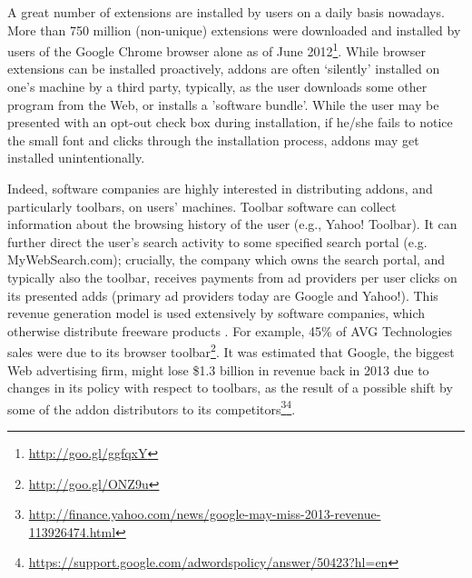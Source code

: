 \documentclass[ijoc,nonblindrev]{informs3} %
\numberwithin{equation}{subsection}
\begin{document}
A great number of extensions are installed by users on a daily basis nowadays. More than 750 million (non-unique) extensions were downloaded and installed by users of the Google Chrome browser alone as of June 2012\footnote{\url{http://goo.gl/ggfqxY}}. While browser extensions can be installed proactively, addons are often `silently' installed on one's machine by a third party, typically, as the user downloads some other program from the Web, or installs a 'software bundle'. While the user may be presented with an opt-out check box during installation, if he/she fails to notice the small font and clicks through the installation process, addons may get installed unintentionally.  

Indeed, software companies are highly interested in distributing addons, and particularly toolbars, on users' machines. Toolbar software can collect information about the browsing history of the user (e.g., Yahoo! Toolbar). It can further direct the user's search activity to some specified search portal (e.g. MyWebSearch.com); crucially, the company which owns the search portal, and typically also the toolbar, receives payments from ad providers per user clicks on its presented adds (primary ad providers today are Google and Yahoo!). This revenue generation model is used extensively by software companies, which otherwise distribute freeware products \citep{leontiadis2012don}. For example, 45\% of AVG Technologies sales were due to its browser toolbar\footnote{\url{http://goo.gl/ONZ9u}}.  It was estimated that Google, the biggest Web advertising firm, might lose \$1.3 billion in revenue back in 2013 due to changes in its policy with respect to toolbars, as the result of a possible shift by some of the addon distributors to its competitors\footnote{\url{http://finance.yahoo.com/news/google-may-miss-2013-revenue-113926474.html}}\footnote{\url{https://support.google.com/adwordspolicy/answer/50423?hl=en}}.
\iffalse 
\end{document}
